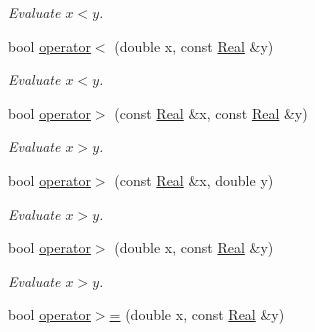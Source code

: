 \begin{DoxyCompactItemize}
\begin{DoxyCompactList}\small\item\em Evaluate $ x<y $. \end{DoxyCompactList}\item 
\hypertarget{namespaceSpacy_acf902aa8dccf69249dbc0acc7d902c37}{}bool \hyperlink{namespaceSpacy_acf902aa8dccf69249dbc0acc7d902c37}{operator$<$} (double x, const \hyperlink{classSpacy_1_1Real}{Real} \&y)\label{namespaceSpacy_acf902aa8dccf69249dbc0acc7d902c37}

\begin{DoxyCompactList}\small\item\em Evaluate $ x<y $. \end{DoxyCompactList}\item 
\hypertarget{namespaceSpacy_a5627f69f9af7347aed06818d53ed0fcc}{}bool \hyperlink{namespaceSpacy_a5627f69f9af7347aed06818d53ed0fcc}{operator$>$} (const \hyperlink{classSpacy_1_1Real}{Real} \&x, const \hyperlink{classSpacy_1_1Real}{Real} \&y)\label{namespaceSpacy_a5627f69f9af7347aed06818d53ed0fcc}

\begin{DoxyCompactList}\small\item\em Evaluate $ x>y $. \end{DoxyCompactList}\item 
\hypertarget{namespaceSpacy_a7436a82dc2beac12c0515c06baddd17a}{}bool \hyperlink{namespaceSpacy_a7436a82dc2beac12c0515c06baddd17a}{operator$>$} (const \hyperlink{classSpacy_1_1Real}{Real} \&x, double y)\label{namespaceSpacy_a7436a82dc2beac12c0515c06baddd17a}

\begin{DoxyCompactList}\small\item\em Evaluate $ x>y $. \end{DoxyCompactList}\item 
\hypertarget{namespaceSpacy_a7caeb49690082f2b1ed24d06f7828cdc}{}bool \hyperlink{namespaceSpacy_a7caeb49690082f2b1ed24d06f7828cdc}{operator$>$} (double x, const \hyperlink{classSpacy_1_1Real}{Real} \&y)\label{namespaceSpacy_a7caeb49690082f2b1ed24d06f7828cdc}

\begin{DoxyCompactList}\small\item\em Evaluate $ x>y $. \end{DoxyCompactList}\item 
\hypertarget{namespaceSpacy_ad17fc80f92e9f83af021512bed01dfef}{}bool \hyperlink{namespaceSpacy_ad17fc80f92e9f83af021512bed01dfef}{operator$>$=} (double x, const \hyperlink{classSpacy_1_1Real}{Real} \&y)\label{namespaceSpacy_ad17fc80f92e9f83af021512bed01dfef}


\end{DoxyCompactItemize}

